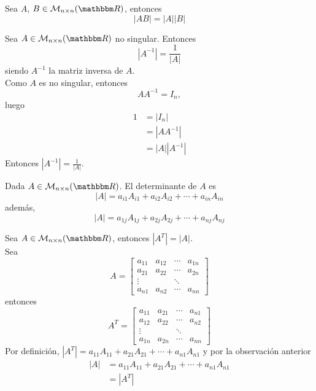 \begin{theorem}\label{JJHCCCFAFTQGQGQHQGC}
    Sea $A$, $B \in \mathcal{M}_{n \times n}(\RR)$, entonces
    $$|AB| = |A||B|$$
\end{theorem}

\begin{theorem}
    Sea $A \in \mathcal{M}_{n \times n}(\RR)$ no singular. Entonces
    $$\left|A^{-1}\right| = \frac{1}{|A|}$$
    siendo $A^{-1}$ la matriz inversa de $A$. \\
    \demostracion Como $A$ es no singular, entonces
    $$AA^{-1}=I_n,$$
    luego
    \begin{align*}
        1 & = |I_n| \\
        & = \left|AA^{-1}\right| \\
        & = |A|\left|A^{-1}\right|
    \end{align*}
    Entonces $\displaystyle \left|A^{-1}\right| = \frac{1}{|A|}$.
\end{theorem}

\begin{observation}
    Dada $A \in \mathcal{M}_{n \times n}(\RR)$. El determinante de $A$ es
    $$|A| = a_{i1}A_{i1} + a_{i2}A_{i2} + \cdots + a_{in}A_{in}$$
    además,
    $$|A| = a_{1j}A_{1j} + a_{2j}A_{2j} + \cdots + a_{nj}A_{nj}$$
\end{observation}

\begin{proposition}
    Sea $A \in \mathcal{M}_{n \times n}(\RR)$, entonces $\left|A^T\right| = |A|$. \\
    \demostracion Sea
    $$A = \begin{bmatrix}
        a_{11} & a_{12} & \cdots & a_{1n}\\
        a_{21} & a_{22} & \cdots & a_{2n}\\
        \vdots &  & \ddots & \\
        a_{n1} & a_{n2} & \cdots & a_{nn}
    \end{bmatrix}$$
    entonces
    $$A^T = \begin{bmatrix}
        a_{11} & a_{21} & \cdots & a_{n1}\\
        a_{12} & a_{22} & \cdots & a_{n2}\\
        \vdots &  & \ddots & \\
        a_{1n} & a_{2n} & \cdots & a_{nn}
    \end{bmatrix}$$
    Por definición,
    $\left|A^T\right| = a_{11}A_{11} + a_{21}A_{21} + \cdots + a_{n1}A_{n1}$
    y por la observación anterior
    \begin{align*}
        |A| & = a_{11}A_{11} + a_{21}A_{21} + \cdots + a_{n1}A_{n1} \\
        & = \left|A^T\right|
    \end{align*}
\end{proposition}

